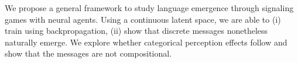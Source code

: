 We propose a general framework to study language emergence through signaling games with neural agents. Using a continuous latent   space, we are able to (i) train using backpropagation, (ii) show that discrete messages nonetheless naturally emerge.  We explore whether categorical perception effects follow and show that the messages are not compositional.
